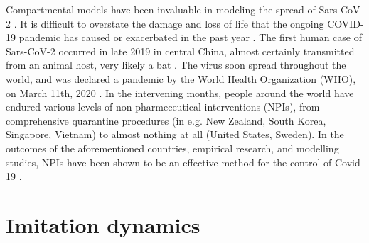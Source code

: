 Compartmental models have been invaluable in modeling the spread of Sars-CoV-2 \cite{thompson2020epidemiological}. It is difficult to overstate the damage and loss of life that the ongoing COVID-19 pandemic has caused or exacerbated in the past year \cite{miller2020disease,who2021impact}. The first human case of Sars-CoV-2 occurred in late 2019 in central China, almost certainly transmitted from an animal host, very likely a bat \cite{andersen2020proximal,rasmussen2021origins,zhu2020novel}. The virus soon spread throughout the world, and was declared a pandemic by the World Health Organization (WHO), on March 11th, 2020 \cite{who2020announces}. In the intervening months, people around the world have endured various levels of non-pharmeceutical interventions (NPIs), from comprehensive quarantine procedures (in e.g. New Zealand, South Korea, Singapore, Vietnam) to almost nothing at all (United States, Sweden). In the outcomes of the aforementioned countries, empirical research, and modelling studies, NPIs have been shown to be an effective method for the control of Covid-19 \cite{anderson2020estimating,flaxman2020estimating,ferguson2020report,demirguc2020sooner}. 



\section{Imitation dynamics}


